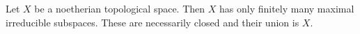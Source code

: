 Let $X$ be a noetherian topological space. Then $X$ has only finitely many maximal irreducible subspaces. These are necessarily closed and their union is $X$.
